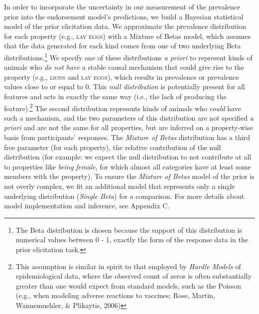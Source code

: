 \documentclass[english,,man,floatsintext]{apa6}
\let\rmarkdownfootnote\footnote%
\def\footnote{\protect\rmarkdownfootnote}
\theoremstyle{definition}
\theoremstyle{definition}
\theoremstyle{definition}
\theoremstyle{remark}
\begin{document}
In order to incorporate the uncertainty in our measurement of the
prevalence prior into the endorsement model's predictions, we build a
Bayesian statistical model of the prior elicitation data. We approximate
the prevalence distribution for each property (e.g., \textsc{lay eggs})
with a Mixture of Betas model, which assumes that the data generated for
each kind comes from one of two underlying Beta distributions.\footnote{The
  Beta distribution is chosen because the support of this distribution
  is numerical values between 0 - 1, exactly the form of the response
  data in the prior elicitation task.} We specify one of these
distributions \emph{a priori} to represent kinds of animals who \emph{do
not have} a stable causal mechanism that could give rise to the property
(e.g., \textsc{lions} and \textsc{lay eggs}), which results in
prevalence or prevalence values close to or equal to 0. This \emph{null
distribution} is potentially present for all features and acts in
exactly the same way (i.e., the lack of producing the
feature).\footnote{This assumption is similar in spirit to that employed
  by \emph{Hurdle Models} of epidemiological data, where the observed
  count of zeros is often substantially greater than one would expect
  from standard models, such as the Poisson (e.g., when modeling adverse
  reactions to vaccines; Rose, Martin, Wannemuehler, \& Plikaytis, 2006)}
The second distribution represents kinds of animals who \emph{could}
have such a mechanism, and the two parameters of this distribution are
not specified \emph{a priori} and are not the same for all properties,
but are inferred on a property-wise basis from participants' responses.
The \emph{Mixture of Betas} distribution has a third free parameter (for
each property), the relative contribution of the null distribution (for
example: we expect the null distribution to not contribute at all to
properties like \emph{being female}, for which almost all categories
have at least some members with the property). To ensure the
\emph{Mixture of Betas} model of the prior is not overly complex, we fit
an additional model that represents only a single underlying
distribution (\emph{Single Beta}) for a comparison. For more details
about model implementation and inference, see Appendix C.
\end{document}
